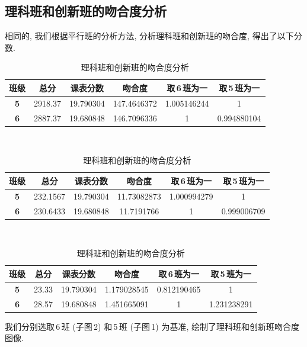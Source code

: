 \documentclass[a4paper]{article}
\begin{document}
 \subsection{理科班和创新班的吻合度分析}
  相同的, 我们根据平行班的分析方法, 分析理科班和创新班的吻合度, 得出了以下分数.
  \begin{table}[H]
  \centering
  \begin{tabular}{|c|c|c|c|c|c|}
  \hline
  \bf 班级 & \bf 总分 & \bf 课表分数 & \bf 吻合度 & \bf 取\,6\,班为一 & \bf 取\,5\,班为一 \\\hline
  \bf 5 & 2918.37 & 19.790304 & 147.4646372 & 1.005146244 & 1 \\\hline
  \bf 6 & 2887.37 & 19.680848 & 146.7096336 & 1 & 0.994880104 \\\hline
  \end{tabular}\\[2mm]
  \begin{tabular}{|c|c|c|c|c|c|}
  \hline
  \bf 班级 & \bf 总分 & \bf 课表分数 & \bf 吻合度 & \bf 取\,6\,班为一 & \bf 取\,5\,班为一 \\\hline
  \bf 5 & 232.1567 & 19.790304 & 11.73082873 & 1.000994279 & 1 \\\hline
  \bf 6 & 230.6433 & 19.680848 & 11.7191766 & 1 & 0.999006709 \\\hline
  \end{tabular}\\[2mm]
  \begin{tabular}{|c|c|c|c|c|c|}
  \hline
  \bf 班级 & \bf 总分 & \bf 课表分数 & \bf 吻合度 & \bf 取\,6\,班为一 & \bf 取\,5\,班为一 \\\hline
  \bf 5 & 23.33 & 19.790304 & 1.179028545 & 0.812190465 & 1 \\\hline
  \bf 6 & 28.57 & 19.680848 & 1.451665091 & 1 & 1.231238291 \\\hline
  \end{tabular}
  \caption{理科班和创新班的吻合度分析}
  \end{table}
  我们分别选取\,6\,班 (子图\,2) 和\,5\,班 (子图\,1) 为基准, 绘制了理科班和创新班吻合度图像.
\end{document}
